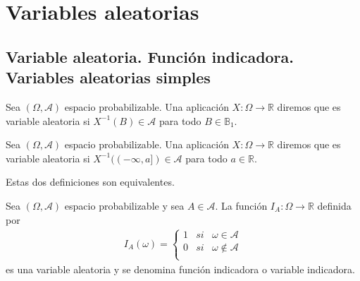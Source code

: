 \chapter{Variables aleatorias}

\section{Variable aleatoria. Función indicadora. Variables aleatorias simples}

\begin{defi}
    Sea $(\Omega, \mathcal{A})$ espacio probabilizable. Una aplicación $X: \Omega \longrightarrow \mathbb{R}$ diremos que es variable aleatoria si $X^{-1}(B) \in \mathcal{A}$ para todo $B \in \mathbb{B}_1$.
\end{defi}

\begin{defi}
    Sea $(\Omega, \mathcal{A})$ espacio probabilizable. Una aplicación $X: \Omega \longrightarrow \mathbb{R}$ diremos que es variable aleatoria si $X^{-1}((-\infty,a]) \in \mathcal{A}$ para todo $a \in \mathbb{R}$.
\end{defi}

\begin{obs}
    Estas dos definiciones son equivalentes.
\end{obs}

\begin{defi}
    Sea $(\Omega, \mathcal{A})$ espacio probabilizable y sea $A \in \mathcal{A}$. La función $I_A: \Omega \longrightarrow \mathbb{R}$ definida por
    \begin{align*}
        I_A(\omega) = \left\{ \begin{array}{lcc}
                                  1 & si & \omega \in \mathcal{A}      \\
                                  0 & si & \omega \not \in \mathcal{A} \\
                              \end{array}
        \right.
    \end{align*}
    es una variable aleatoria y se denomina función indicadora o variable indicadora.
\end{defi}

